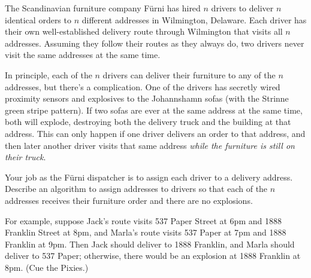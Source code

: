 \begin{exercises}
\item The Scandinavian furniture company Fürni has hired $n$ drivers to deliver $n$ identical orders to $n$ different addresses in Wilmington, Delaware. Each driver has their own well-established delivery route through Wilmington that visits all $n$ addresses. Assuming they follow their routes as they always do, two drivers never visit the same addresses at the same time.

In principle, each of the $n$ drivers can deliver their furniture to any of the $n$ addresses, but there’s a complication. One of the drivers has secretly wired proximity sensors and explosives to the Johannshamn sofas (with the Strinne green stripe pattern). If two sofas are ever at the same address at the same time, both will explode, destroying both the delivery truck and the building at that address. This can only happen if one driver delivers an order to that address, and then later another driver visits that same address \textit{while the furniture is still on their truck}.

Your job as the Fürni dispatcher is to assign each driver to a delivery address. Describe an algorithm to assign addresses to drivers so that each of the $n$ addresses receives their furniture order and there are no explosions.

For example, suppose Jack’s route visits 537 Paper Street at 6pm and 1888 Franklin Street at 8pm, and Marla’s route visits 537 Paper at 7pm and 1888 Franklin at 9pm. Then Jack should deliver to 1888 Franklin, and Marla should deliver to 537 Paper; otherwise, there would be an explosion at 1888 Franklin at 8pm. (Cue the Pixies.) 


\end{exercises}
